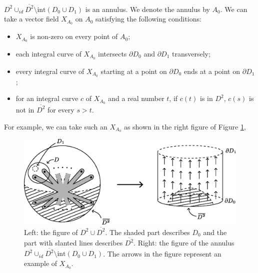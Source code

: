 \documentclass{amsart}
\theoremstyle{plain}
\theoremstyle{definition}
\begin{document}
\par

$D^2\cup_{id}\overline{D^2}\setminus\text{int}(D_0\cup D_1)$ is an annulus. 
We denote the annulus by $A_0$. 
We can take a vector field $X_{A_0}$ on $A_0$ satisfying the following conditions: 

\begin{itemize}

\item $X_{A_0}$ is non-zero on every point of $A_0$; 

\item each integral curve of $X_{A_0}$ intersects $\partial D_0$ and $\partial D_1$ transversely; 

\item every integral curve of $X_{A_0}$ starting at a point on $\partial D_0$ ends at a point on $\partial D_1$; 

\item for an integral curve $c$ of $X_{A_0}$ and a real number $t$, if $c(t)$ is in $D^2$, $c(s)$ is not in $\overline{D^2}$ for every $s>t$. 

\end{itemize}

For example, we can take such an $X_{A_0}$ as shown in the right figure of Figure \ref{annulus}, 

\begin{figure}[t]
\begin{center}
\includegraphics[width=145mm]{annulus.eps}
\end{center}
\caption{Left: the figure of $D^2\cup\overline{D^2}$. 
The shaded part describes $D_0$ and the part with slanted lines describes $\overline{D^2}$. 
Right: the figure of the annulus $D^2\cup_{id}\overline{D^2}\setminus\text{int}(D_0\cup D_1)$. 
The arrows in the figure represent an example of $X_{A_0}$. 
}
\label{annulus}
\end{figure}
\end{document}
